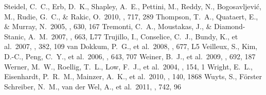 \documentclass[apj]{emulateapj}
\begin{document}
\begin{thebibliography}{}
 Steidel, C.~C., Erb, D.~K.,
  Shapley, A.~E., Pettini, M., Reddy, N., Bogosavljevi{\'c}, M.,
  Rudie, G.~C., \& Rakic, O.\ 2010, \apj, 717, 289
 Thompson, T.~A., Quataert, E.,
  \& Murray, N.\ 2005, \apj, 630, 167
 Tremonti, C.~A., Moustakas, J.,
  \& Diamond-Stanic, A.~M.\ 2007, \apjl, 663, L77
 Trujillo, I., Conselice, C.~J.,
  Bundy, K., et al.\ 2007, \mnras, 382, 109
 van Dokkum, P.~G., et
  al.\ 2008, \apjl, 677, L5
 Veilleux, S., Kim, D.-C., Peng,
  C.~Y., et al.\ 2006, \apj, 643, 707
 Weiner, B.~J., et al.\ 2009,
  \apj, 692, 187
 Werner, M.~W., Roellig, T.~L.,
  Low, F.~J., et al.\ 2004, \apjs, 154, 1
 Wright, E.~L., Eisenhardt,
  P.~R.~M., Mainzer, A.~K., et al.\ 2010, \aj, 140, 1868
 Wuyts, S., F{\"o}rster Schreiber,
  N.~M., van der Wel, A., et al.\ 2011, \apj, 742, 96
\end{thebibliography}


\clearpage










% 

\end{document}
